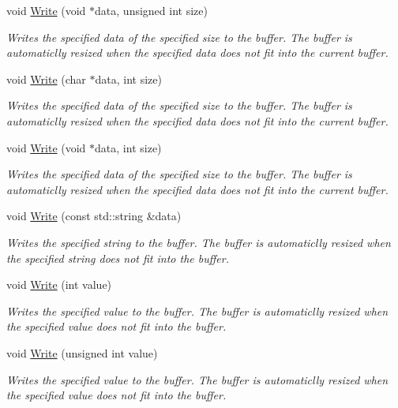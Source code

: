 \begin{DoxyCompactItemize}
void \hyperlink{class_senergy_1_1_byte_buffer_ac4a328ba46fb339b37cb0475c6944c18}{Write} (void $\ast$data, unsigned int size)
\begin{DoxyCompactList}\small\item\em Writes the specified data of the specified size to the buffer. The buffer is automaticlly resized when the specified data does not fit into the current buffer. \end{DoxyCompactList}\item 
void \hyperlink{class_senergy_1_1_byte_buffer_a3dbfe87ee79c1322252c625bf4915f18}{Write} (char $\ast$data, int size)
\begin{DoxyCompactList}\small\item\em Writes the specified data of the specified size to the buffer. The buffer is automaticlly resized when the specified data does not fit into the current buffer. \end{DoxyCompactList}\item 
void \hyperlink{class_senergy_1_1_byte_buffer_adeb00769eae3728d222587e00810d422}{Write} (void $\ast$data, int size)
\begin{DoxyCompactList}\small\item\em Writes the specified data of the specified size to the buffer. The buffer is automaticlly resized when the specified data does not fit into the current buffer. \end{DoxyCompactList}\item 
void \hyperlink{class_senergy_1_1_byte_buffer_a9dc9ad6de5d9401a698984634537b27a}{Write} (const std\-::string \&data)
\begin{DoxyCompactList}\small\item\em Writes the specified string to the buffer. The buffer is automaticlly resized when the specified string does not fit into the buffer. \end{DoxyCompactList}\item 
void \hyperlink{class_senergy_1_1_byte_buffer_ab523222c96a0c1fff96a7f6c2794ca2d}{Write} (int value)
\begin{DoxyCompactList}\small\item\em Writes the specified value to the buffer. The buffer is automaticlly resized when the specified value does not fit into the buffer. \end{DoxyCompactList}\item 
void \hyperlink{class_senergy_1_1_byte_buffer_a8a51e4f9795d312ff2ab8f152b533bb7}{Write} (unsigned int value)
\begin{DoxyCompactList}\small\item\em Writes the specified value to the buffer. The buffer is automaticlly resized when the specified value does not fit into the buffer. \end{DoxyCompactList}\item 

\end{DoxyCompactItemize}
